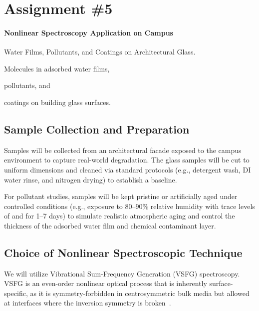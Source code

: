 
\section{Assignment \#5}

\begingroup
\renewcommand \thesubsection {\arabic{subsection}.}
\renewcommand \chapter [2]{}

\paragraph{Nonlinear Spectroscopy Application on Campus}
\leavevmode \par
Water Films, Pollutants, and Coatings on Architectural Glass.
\begin{enumerate*}
  \item Molecules in adsorbed water films,
  \item pollutants, and
  \item coatings on building glass surfaces.
\end{enumerate*}

\subsection{Sample Collection and Preparation}

Samples will be collected from an architectural facade exposed to the campus
environment to capture real-world degradation. The glass samples will be cut to
uniform dimensions and cleaned via standard protocols (e.g., detergent wash, DI
water rinse, and nitrogen drying) to establish a baseline.

For pollutant studies, samples will be kept pristine or artificially aged under
controlled conditions (e.g., exposure to 80--90\% relative humidity with trace
levels of  and  for 1--7 days) to simulate realistic
atmospheric aging and control the thickness of the adsorbed water film and
chemical contaminant layer.

\subsection{Choice of Nonlinear Spectroscopic Technique}

We will utilize Vibrational Sum-Frequency Generation (VSFG) spectroscopy.
VSFG is an even-order nonlinear optical process that is inherently
surface-specific, as it is symmetry-forbidden in centrosymmetric bulk media but
allowed at interfaces where the inversion symmetry is
broken~\cite{jubb2012environmental}.

